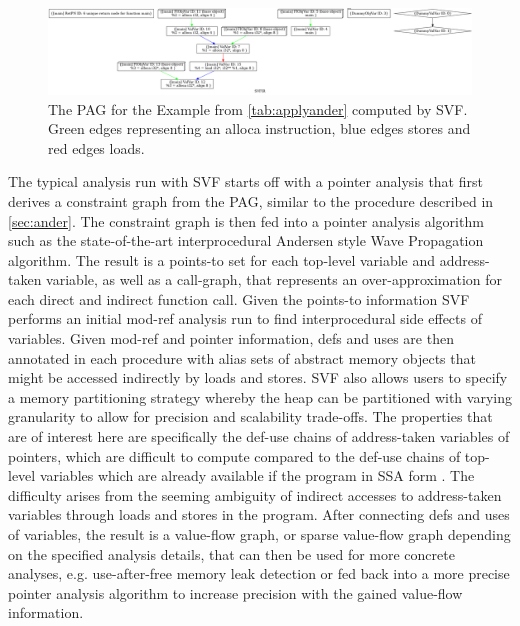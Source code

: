 \begin{figure}
    \centering
    \includegraphics[width=1.\textwidth]{img/pag.png}
    \caption[An example PAG as produced by SVF]{The PAG for the Example from \autoref{tab:applyander} computed by SVF.
        Green edges representing an alloca instruction, blue edges stores and red edges loads.}
    \label{fig:pag}
\end{figure}

The typical analysis run with SVF starts off with a pointer analysis that first derives a constraint graph from the PAG, similar to the procedure described in \autoref{sec:ander}.
The constraint graph is then fed into a pointer analysis algorithm such as the state-of-the-art interprocedural Andersen style Wave Propagation algorithm.
The result is a points-to set for each top-level variable and address-taken variable, as well as a call-graph, that represents an over-approximation for each direct and indirect function call.
Given the points-to information SVF performs an initial mod-ref analysis run to find interprocedural side effects of variables. Given mod-ref and pointer information, defs and uses are then annotated in each procedure with alias sets of abstract memory objects that might be accessed indirectly by loads and stores.
SVF also allows users to specify a memory partitioning strategy whereby the heap can be partitioned with varying granularity to allow for precision and scalability trade-offs.
The properties that are of interest here are specifically the def-use chains of address-taken variables of pointers, which are difficult to compute compared to the def-use chains of top-level variables which are already available if the program in SSA form \cite{sui2016svf}.
The difficulty arises from the seeming ambiguity of indirect accesses to address-taken variables through loads and stores in the program.
After connecting defs and uses of variables, the result is a value-flow graph, or sparse value-flow graph depending on the specified analysis details, that can then be used for more concrete analyses, e.g. use-after-free memory leak detection \cite{sui2014detecting} or fed back into a more precise pointer analysis algorithm to increase precision with the gained value-flow information.

